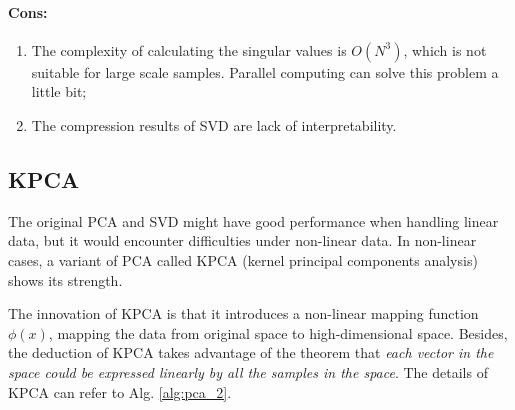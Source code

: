 \documentclass[12pt,a4paper]{article}
\theoremstyle{definition}
\begin{document}
\vspace{-0.03\linewidth}
\paragraph{Cons:}
\begin{enumerate}
	\item The complexity of calculating the singular values is $O(N^3)$, which is not suitable for large scale samples. Parallel computing can solve this problem a little bit;
	
	\item The compression results of SVD are lack of interpretability.
\end{enumerate}

\subsection{KPCA}
The original PCA and SVD might have good performance when handling linear data, but it would encounter difficulties under non-linear data. In non-linear cases, a variant of PCA called KPCA (kernel principal components analysis) shows its strength.

The innovation of KPCA is that it introduces a non-linear mapping function $\phi(x)$, mapping the data from original space to high-dimensional space. Besides, the deduction of KPCA takes advantage of the theorem that \textit{each vector in the space could be expressed linearly by all the samples in the space}. The details of KPCA can refer to Alg. \ref{alg:pca_2}.
\end{document}
